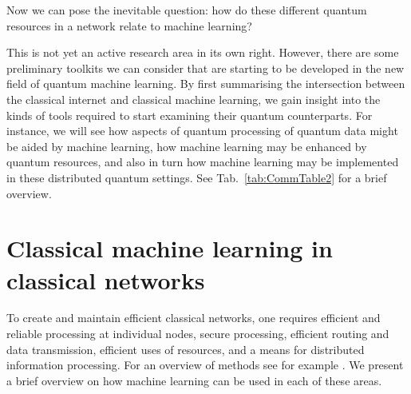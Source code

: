 \documentclass[twocolumn, aps, rmp, amsmath, amssymb, nofootinbib, superscriptaddress, longbibliography, floatfix, table-of-contents, eqsecnum]{revtex4}
\begin{document}
Now we can pose the inevitable question: how do these different quantum resources in a network relate to machine learning?

This is not yet an active research area in its own right. However, there are some preliminary toolkits we can consider that are starting to be developed in the new field of quantum machine learning. By first summarising the intersection between the classical internet and classical machine learning, we gain insight into the kinds of tools required to start examining their quantum counterparts. For instance, we will see how aspects of quantum processing of quantum data might be aided by machine learning, how machine learning may be enhanced by quantum resources, and also in turn how machine learning may be implemented in these distributed quantum settings. See Tab.~\ref{tab:CommTable2} for a brief overview. 


\section{Classical machine learning in classical networks}

To create and maintain efficient classical networks, one requires efficient and reliable processing at individual nodes, secure processing, efficient routing and data transmission, efficient uses of resources, and a means for distributed information processing. For an overview of methods see for example \cite{bib:boutaba2018comprehensive, bib:wang2018machine}. We present a brief overview on how machine learning can be used in each of these areas. 
\end{document}
